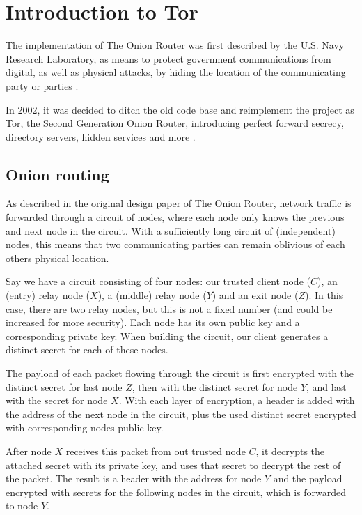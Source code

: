 \documentclass[journal]{IEEEtran}
\begin{document}
		
\section{Introduction to Tor}
	\label{sec:tor}
	The implementation of The Onion Router was first described by the U.S. Navy Research Laboratory, as means to protect government communications from digital, as well as physical attacks, by hiding the location of the communicating party or parties \cite{goldschlag1996hiding}.

	In 2002, it was decided to ditch the old code base and reimplement the project as Tor, the Second Generation Onion Router, introducing perfect forward secrecy, directory servers, hidden services and more \cite{dingledine2004tor}.
		
	\subsection{Onion routing}
		As described in the original design paper of The Onion Router, network traffic is forwarded through a circuit of nodes, where each node only knows the previous and next node in the circuit. With a sufficiently long circuit of (independent) nodes, this means that two communicating parties can remain oblivious of each others physical location.
					
		Say we have a circuit consisting of four nodes: our trusted client node ($C$), an (entry) relay node ($X$), a (middle) relay node ($Y$) and an exit node ($Z$). In this case, there are two relay nodes, but this is not a fixed number (and could be increased for more security). Each node has its own public key and a corresponding private key. When building the circuit, our client generates a distinct secret for each of these nodes.
					
		The payload of each packet flowing through the circuit is first encrypted with the distinct secret for last node $Z$, then with the distinct secret for node $Y$, and last with the secret for node $X$. With each layer of encryption, a header is added with the address of the next node in the circuit, plus the used distinct secret encrypted with corresponding nodes public key. 
					
		After node $X$ receives this packet from out trusted node $C$, it decrypts the attached secret with its private key, and uses that secret to decrypt the rest of the packet. The result is a header with the address for node $Y$ and the payload encrypted with secrets for the following nodes in the circuit, which is forwarded to node $Y$.
					
\end{document}
